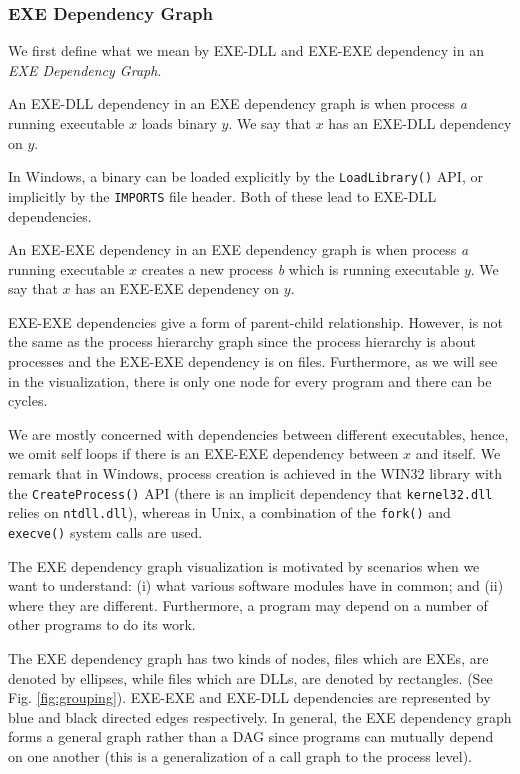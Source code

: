 \subsubsection{EXE Dependency Graph}
\label{sec:exe-dep-graph}

We first define what we mean by EXE-DLL and EXE-EXE dependency in
an {\em EXE Dependency Graph}.

\begin{definition}
An EXE-DLL dependency in an EXE dependency graph
is when process {\em a} running executable
$x$ loads binary $y$. 
We say that $x$ has an EXE-DLL dependency on $y$.
\end{definition}
In Windows, a binary can be loaded explicitly by the {\tt LoadLibrary()} API,
or implicitly by the {\tt IMPORTS} file header.
Both of these lead to EXE-DLL dependencies.

\begin{definition}
An EXE-EXE dependency in an EXE dependency graph
is when process {\em a} running executable $x$ creates
a new process {\em b} which is running executable $y$.
We say that $x$ has an EXE-EXE dependency on $y$.
\end{definition}

EXE-EXE dependencies give a form of parent-child relationship.
However, is not the same as the process hierarchy graph
since the process hierarchy is about processes and the EXE-EXE
dependency is on files.
Furthermore, as we will see in the visualization, 
there is only one node for every program and there can be cycles.

We are mostly concerned with dependencies between different executables,
hence, we omit self loops if there is an EXE-EXE dependency between $x$ and
itself.
We remark that in Windows, process creation is achieved in the WIN32 library
with the {\tt CreateProcess()} API (there
is an implicit dependency that {\tt kernel32.dll} relies on {\tt ntdll.dll}), 
where\-as in Unix, a combination of the 
{\tt fork()} and {\tt execve()} system calls
are used.

The EXE dependency graph visualization is motivated by scenarios when
we want to understand: (i) what various software modules have in common;
and (ii) where they are different.
Furthermore, a program may depend
on a number of other programs to do its work.

The EXE dependency graph has two kinds of nodes, 
files which are EXEs, are denoted by ellipses, while
files which are DLLs, are denoted by rectangles. 
(See Fig. \ref{fig:grouping}).
EXE-EXE and EXE-DLL dependencies are represented by
blue and black directed edges respectively.
In general, the EXE dependency graph forms a general graph rather than a 
DAG since programs can mutually depend on one another 
(this is a generalization of a call graph to the process level).

